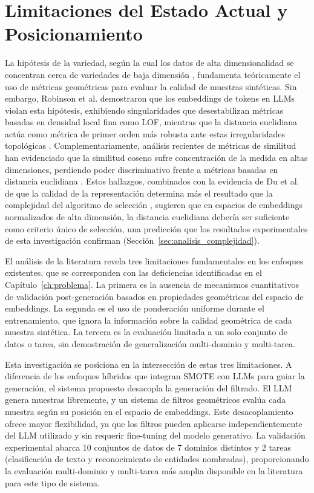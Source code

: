 \section{Limitaciones del Estado Actual y Posicionamiento}

La hipótesis de la variedad, según la cual los datos de alta dimensionalidad se concentran cerca de variedades de baja dimensión \cite{bengio2013representation, fefferman2016testing}, fundamenta teóricamente el uso de métricas geométricas para evaluar la calidad de muestras sintéticas. Sin embargo, Robinson et al. demostraron que los embeddings de tokens en LLMs violan esta hipótesis, exhibiendo singularidades que desestabilizan métricas basadas en densidad local fina como LOF, mientras que la distancia euclidiana actúa como métrica de primer orden más robusta ante estas irregularidades topológicas \cite{robinson2025manifold}. Complementariamente, análisis recientes de métricas de similitud han evidenciado que la similitud coseno sufre concentración de la medida en altas dimensiones, perdiendo poder discriminativo frente a métricas basadas en distancia euclidiana \cite{tessari2024diem}. Estos hallazgos, combinados con la evidencia de Du et al. de que la calidad de la representación determina más el resultado que la complejidad del algoritmo de selección \cite{du2025disentangling}, sugieren que en espacios de embeddings normalizados de alta dimensión, la distancia euclidiana debería ser suficiente como criterio único de selección, una predicción que los resultados experimentales de esta investigación confirman (Sección~\ref{sec:analisis_complejidad}).

El análisis de la literatura revela tres limitaciones fundamentales en los enfoques existentes, que se corresponden con las deficiencias identificadas en el Capítulo~\ref{ch:problema}. La primera es la ausencia de mecanismos cuantitativos de validación post-generación basados en propiedades geométricas del espacio de embeddings. La segunda es el uso de ponderación uniforme durante el entrenamiento, que ignora la información sobre la calidad geométrica de cada muestra sintética. La tercera es la evaluación limitada a un solo conjunto de datos o tarea, sin demostración de generalización multi-dominio y multi-tarea.

Esta investigación se posiciona en la intersección de estas tres limitaciones. A diferencia de los enfoques híbridos que integran SMOTE con LLMs para guiar la generación, el sistema propuesto desacopla la generación del filtrado. El LLM genera muestras libremente, y un sistema de filtros geométricos evalúa cada muestra según su posición en el espacio de embeddings. Este desacoplamiento ofrece mayor flexibilidad, ya que los filtros pueden aplicarse independientemente del LLM utilizado y sin requerir fine-tuning del modelo generativo. La validación experimental abarca 10 conjuntos de datos de 7 dominios distintos y 2 tareas (clasificación de texto y reconocimiento de entidades nombradas), proporcionando la evaluación multi-dominio y multi-tarea más amplia disponible en la literatura para este tipo de sistema.
